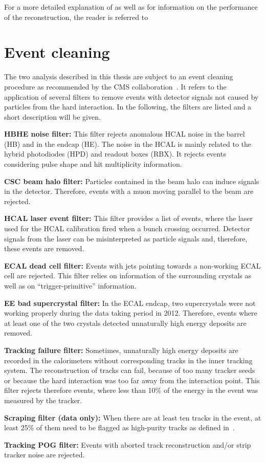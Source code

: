 For a more detailed explanation of \met as well as for information on the performance of the reconstruction, the reader is referred to~\cite{bib:CMS:METReconstruction}

\section{Event cleaning}
The two analysis described in this thesis are subject to an event cleaning procedure as recommended by the CMS collaboration~\cite{bib:CMS:EventCleaning}.
It refers to the application of several filters to remove events with detector signals not caused by particles from the hard interaction. 
In the following, the filters are listed and a short description will be given.
\begin{description} 
\item \textbf{HBHE noise filter:} This filter rejects anomalous HCAL noise in the barrel (HB) and in the endcap (HE). The noise in the HCAL is mainly related to the hybrid photodiodes (HPD) and readout boxes (RBX). It rejects events considering pulse shape and hit multiplicity information.
\item \textbf{CSC beam halo filter:} Particles contained in the beam halo can induce signals in the detector. Therefore, events with a muon moving parallel to the beam are rejected.  
\item \textbf{HCAL laser event filter:} This filter provides a list of events, where the laser used for the HCAL calibration fired when a bunch crossing occurred. Detector signals from the laser can be misinterpreted as particle signals and, therefore, these events are removed.
\item \textbf{ECAL dead cell filter:} Events with jets pointing towards a non-working ECAL cell are rejected. This filter relies on information of the surrounding crystals as well as on ``trigger-primitive'' information.
\item \textbf{EE bad supercrystal filter:} In the ECAL endcap, two supercrystals were not working properly during the data taking period in 2012. Therefore, events where at least one of the two crystals detected unnaturally high energy deposits are removed. 
\item \textbf{Tracking failure filter:} Sometimes, unnaturally high energy deposits are recorded in the calorimeters without corresponding tracks in the inner tracking system. The reconstruction of tracks can fail, because of too many tracker seeds or because the hard interaction was too far away from the interaction point.
This filter rejects therefore events, where less than 10\% of the energy in the event was measured by the tracker.  
\item \textbf{Scraping filter (data only):} When there are at least ten tracks in the event, at least 25\% of them need to be flagged as high-purity tracks as defined in~\cite{bib:CMS:Tracking_2010}.
\item \textbf{Tracking POG filter:} Events with aborted track reconstruction and/or strip tracker noise are rejected.
\end{description}



